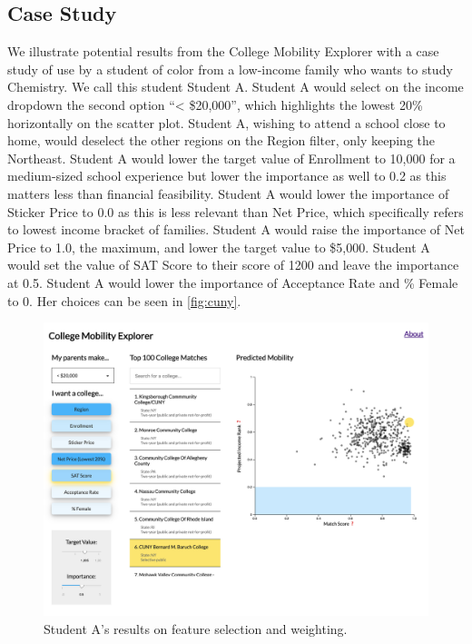 \documentclass{vgtc}
\begin{document}
\subsection{Case Study}
We illustrate potential results from the College Mobility Explorer with a case study of use by a student of color from a low-income family who wants to study Chemistry. We call this student Student A. Student A would select on the income dropdown the second option “< \$20,000”, which highlights the lowest 20\% horizontally on the scatter plot. Student A, wishing to attend a school close to home, would deselect the other regions on the Region filter, only keeping the Northeast. Student A would lower the target value of Enrollment to 10,000 for a medium-sized school experience but lower the importance as well to 0.2 as this matters less than financial feasibility. Student A would lower the importance of Sticker Price to 0.0 as this is less relevant than Net Price, which specifically refers to lowest income bracket of families. Student A would raise the importance of Net Price to 1.0, the maximum, and lower the target value to \$5,000. Student A would set the value of SAT Score to their score of 1200 and leave the importance at 0.5. Student A would lower the importance of Acceptance Rate and \% Female to 0. Her choices can be seen in \autoref{fig:cuny}.

\begin{figure}[tbh]
 \centering
 \includegraphics[width=\columnwidth]{cuny.png}
 \caption{Student A's results on feature selection and weighting.}
 \label{fig:cuny}
\end{figure}
\end{document}
